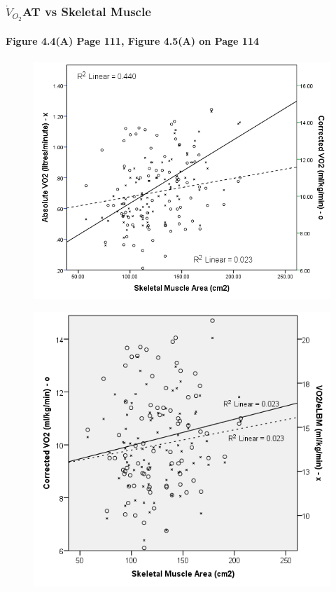 \documentclass[10pt]{beamer}
\begin{document}
\begin{frame}
	\frametitle{$\dot{V}_{O_2}$AT vs Skeletal Muscle}
	\framesubtitle{Figure 4.4(A) Page 111, Figure 4.5(A) on Page 114}


	\begin{figure}
		\includegraphics[height=0.4\textheight]{../Figures/bc_scatter_VO2_skeletal}
	\end{figure}

	\begin{figure}
		\includegraphics[height=0.45\textheight]{../Figures/bc_scatter_VO2_skeletal_elbm}
	\end{figure}
	
\end{frame}
\end{document}
